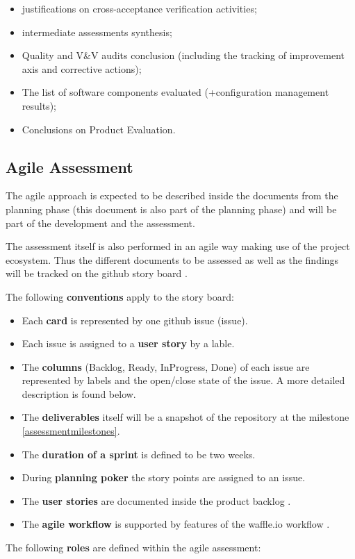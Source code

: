 \documentclass[openetcs]{template/openetcs_article}
\begin{document}
\begin{itemize}
\item justifications on cross-acceptance verification activities;
\item intermediate assessments synthesis;
\item Quality and V\&V audits conclusion (including the tracking of improvement axis and corrective actions);
\item The list of software components evaluated (+configuration management results);
\item Conclusions on Product Evaluation.
\end{itemize}



\subsection{Agile Assessment}
The agile approach is expected to be described inside the documents from the planning phase (this document is also part of the planning phase) and will be part of the development and the assessment.

The assessment itself is also performed in an agile way making use of the project ecosystem. Thus the different documents to be assessed as well as the findings will be tracked on the github story board \cite{ASB}. 

The following \textbf{conventions} apply to the story board:
\begin{itemize}
\item Each \textbf{card} is represented by one github issue (issue).
\item Each issue is assigned to a \textbf{user story} by a lable.
\item The \textbf{columns} (Backlog, Ready, InProgress, Done) of each issue are represented by labels and the open/close state of the issue. A more detailed description is found below.
\item The \textbf{deliverables} itself will be a snapshot of the repository at the milestone \ref{assessmentmilestones}.
\item The \textbf{duration of a sprint} is defined to be two weeks.
\item During \textbf{planning poker}  the story points are assigned to an issue.
\item The \textbf{user stories} are documented inside the product backlog \cite{productbacklog}.
\item The \textbf{agile workflow} is supported by features of the waffle.io workflow \cite{waffleworkflow}.
\end{itemize}
The following \textbf{roles} are defined within the agile assessment:
\end{document}
